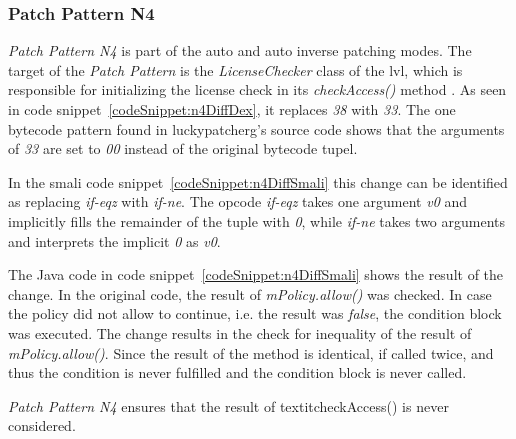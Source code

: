 \subsubsection{Patch Pattern N4}
 \textit{Patch Pattern N4} is part of the auto and auto inverse patching modes.
The target of the \textit{Patch Pattern} is the \textit{LicenseChecker} class of the \gls{lvl}, which is responsible for initializing the license check in its \textit{checkAccess()} method \cite{developersLicensingReference}.
\newline
As seen in code snippet~\ref{codeSnippet:n4DiffDex}, it replaces \textit{38} with \textit{33}.
The one bytecode pattern found in \gls{luckypatcherg}'s source code shows that the arguments of \textit{33} are set to \textit{00} instead of the original bytecode tupel.
\newline

In the smali code snippet~\ref{codeSnippet:n4DiffSmali} this change can be identified as replacing \textit{if-eqz} with \textit{if-ne}.
The opcode \textit{if-eqz} takes one argument \textit{v0} and implicitly fills the remainder of the tuple with \textit{0}, while \textit{if-ne} takes two arguments and interprets the implicit \textit{0} as \textit{v0}.
\newline

The Java code in code snippet~\ref{codeSnippet:n4DiffSmali} shows the result of the change.
In the original code, the result of \textit{mPolicy.allow()} was checked.
In case the policy did not allow to continue, i.e. the result was \textit{false}, the condition block was executed.
The change results in the check for inequality of the result of \textit{mPolicy.allow()}.
Since the result of the method is identical, if called twice, and thus the condition is never fulfilled and the condition block is never called.
\newline

\textit{Patch Pattern N4} ensures that the result of textit{checkAccess()} is never considered.

